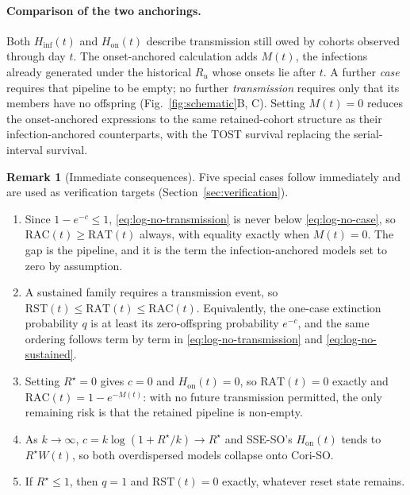 \documentclass[11pt,a4paper]{article}
\theoremstyle{plain}
\theoremstyle{definition}
\newtheorem*{remark}{Remark}
\newcommand{\Rreset}{R^{\star}}
\newcommand{\RAC}{\mathrm{RAC}}
\newcommand{\RAT}{\mathrm{RAT}}
\newcommand{\RST}{\mathrm{RST}}
\newcommand{\sseso}{SSE-SO}
\newcommand{\coriso}{Cori-SO}
\begin{document}
\paragraph{Comparison of the two anchorings.} Both $H_{\mathrm{inf}}(t)$ and
$H_{\mathrm{on}}(t)$ describe transmission still owed by cohorts observed through day $t$.
The onset-anchored calculation adds $M(t)$, the infections already generated under the historical
$R_u$ whose onsets lie after $t$. A further \emph{case} requires that pipeline to be empty; no
further \emph{transmission} requires only that its members have no offspring
(Fig.~\ref{fig:schematic}B, C). Setting $M(t)=0$
reduces the onset-anchored expressions to the same retained-cohort structure as their
infection-anchored counterparts, with the TOST survival replacing the serial-interval survival.

\begin{remark}[Immediate consequences]
Five special cases follow immediately and are used as verification targets
(Section~\ref{sec:verification}).
\begin{enumerate}[label=(\roman*)]
  \item Since $1 - e^{-c} \le 1$, \eqref{eq:log-no-transmission} is never below
    \eqref{eq:log-no-case}, so $\RAC(t) \ge \RAT(t)$ always, with equality exactly when
    $M(t) = 0$. The gap is the pipeline, and it is the term the infection-anchored models set to
    zero by assumption.
  \item A sustained family requires a transmission event, so
    $\RST(t)\leq\RAT(t)\leq\RAC(t)$. Equivalently, the one-case extinction probability $q$ is at
    least its zero-offspring probability $e^{-c}$, and the same ordering follows term by term in
    \eqref{eq:log-no-transmission} and \eqref{eq:log-no-sustained}.
  \item Setting $\Rreset = 0$ gives $c = 0$ and $H_{\mathrm{on}}(t) = 0$, so $\RAT(t) = 0$
    exactly and $\RAC(t) = 1 - e^{-M(t)}$: with no future transmission permitted, the only
    remaining risk is that the retained pipeline is non-empty.
  \item As $k \to \infty$, $c = k\log(1+\Rreset/k) \to \Rreset$ and \sseso{}'s
    $H_{\mathrm{on}}(t)$ tends to
    $\Rreset W(t)$, so both overdispersed models collapse onto \coriso{}.
  \item If $\Rreset\leq1$, then $q=1$ and $\RST(t)=0$ exactly, whatever reset state remains.
\end{enumerate}
\end{remark}
\end{document}
